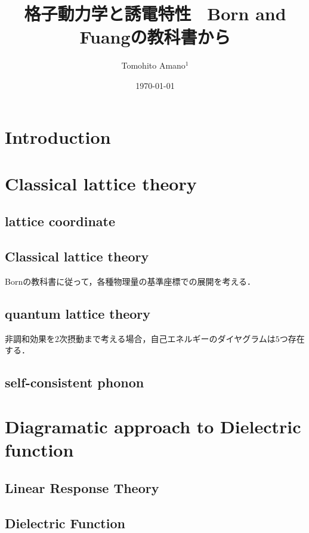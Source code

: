 \documentclass[twocolumn,showpacs,prb,amsfonts,amsmath,amssymb,floatfix,groupedaddress]{ltjsarticle} %
\begin{document}
\title{格子動力学と誘電特性~ Born and Fuangの教科書から}
\author{Tomohito Amano$^{1}$}

\date{\today}

\maketitle


\section{Introduction}


\section{Classical lattice theory}

\subsection{lattice coordinate}


\subsection{Classical lattice theory}
Bornの教科書に従って，各種物理量の基準座標での展開を考える．


\subsection{quantum lattice theory}
非調和効果を$2$次摂動まで考える場合，自己エネルギーのダイヤグラムは$5$つ存在する．


\subsection{self-consistent phonon}



\section{Diagramatic approach to Dielectric function}
\subsection{Linear Response Theory}
\subsection{Dielectric Function}




\end{document}
